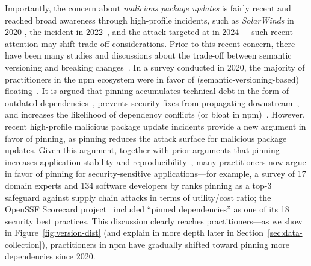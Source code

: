 Importantly, the concern about \emph{malicious package updates} is fairly recent and reached broad awareness through high-profile incidents, such as \textit{SolarWinds} in 2020 \cite{solar-wind}, the  incident in 2022~\cite{node-ipc}, and the  attack targeted at  in 2024~\cite{xz-utils}---such recent attention may shift trade-off considerations.
Prior to this recent concern, there have been many studies and discussions about the trade-off between semantic versioning and breaking changes~\cite[e.g.,][]{DBLP:journals/jss/RaemaekersDV17, DBLP:journals/tosem/BogartKHT21, DBLP:journals/tse/JafariCAST22}.
In a survey conducted in 2020, the majority of practitioners in the npm ecosystem were in favor of (semantic-versioning-based) floating~\cite{DBLP:journals/tse/JafariCAST22}.
It is argued that pinning accumulates technical debt in the form of outdated dependencies~\cite{i-have-misgivings-about-all-these-version-pinning, DBLP:journals/tse/JafariCAST22}, prevents security fixes from propagating downstream~\cite{DBLP:journals/ese/ChinthanetKMIIM21, DBLP:journals/tse/0038SP00C0023}, and increases the likelihood of dependency conflicts (or bloat in npm)~\cite{floating-discussion, should-i-pin-python-deps}.
However, recent high-profile malicious package update incidents provide a new argument in favor of pinning, as pinning reduces the attack surface for malicious package updates.
Given this argument, together with prior arguments that pinning increases application stability and reproducibility~\cite{pin-your-npm-yarn-dependencies, stop-version-range, pin-exact-dep-versions}, many practitioners now argue in favor of pinning for security-sensitive applications---for example, a survey of 17 domain experts and 134 software developers by \citet{DBLP:conf/sp/LadisaPMB23} ranks pinning as a top-3 safeguard against supply chain attacks in terms of utility/cost ratio; the OpenSSF Scorecard project~\cite{openssf-pinning, DBLP:journals/ieeesp/ZahanKHSW23} included ``pinned dependencies'' as one of its 18 security best practices.
This discussion clearly reaches practitioners---as we show in Figure~\ref{fig:version-dist} (and explain in more depth later in Section~\ref{sec:data-collection}), practitioners in npm have gradually shifted toward pinning more dependencies since 2020.

